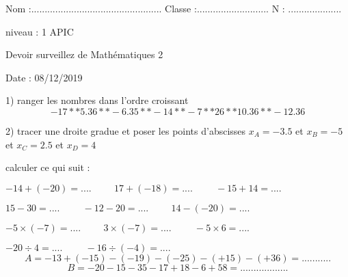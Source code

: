 \documentclass[addpoints]{exam}
\begin{document}
Nom :.................................................
Classe :...........................
N : ....................
\vspace{0.5cm}
\begin{tcolorbox}
\begin{minipage}{0.2\linewidth}
niveau : 1 APIC
\end{minipage}\hfill
\begin{minipage}{0.5\linewidth}
Devoir surveillez de Mathématiques 2
\end{minipage}\hfill
\begin{minipage}{0.3\linewidth}
Date : 08/12/2019
\end{minipage}
\end{tcolorbox}

\begin{tcolorbox}[title=Exercice 1]
1) ranger les nombres dans l'ordre croissant
\[-17 ** 5.36 ** -6.35 ** - 14 ** -7 ** 26 ** 10.36 **-12.36   \]

\vspace{1cm}
2) tracer une droite gradue et poser les points d'abscisses $x_{A}=-3.5 $ et $x_{B}=-5 $ et $x_{C}=2.5 $ et $x_{D}=4 $

\vspace{1cm}
\end{tcolorbox}

\begin{tcolorbox}[title=Exercice 2]
calculer ce qui suit :

 $-14 + (-20)= . . . . \hspace{1cm} 17+(-18)=. . . . \hspace{1cm} -15+14=. . . .  $
 
\vspace{1cm}
 $15-30= . . . . \hspace{1cm} -12-20= . . . . \hspace{1cm} 14-(-20)= . . . .  $
 
\vspace{1cm}
 $-5\times (-7)= . . . . \hspace{1cm}  3\times (-7) = . . . . \hspace{1cm} -5\times 6 = . . . . $ 
 
\vspace{1cm}
$-20\div 4 = . . . . \hspace{1cm}  -16\div (-4)= . . . .  $ 
\[A=-13+(-15)-(-19)-(-25)-(+15)-(+36)=. .. .. .. .. ..\] 
\[B=-20-15-35-17+18-6+58=. .. . .... .... ......\] 
\end{tcolorbox}
\end{document}
